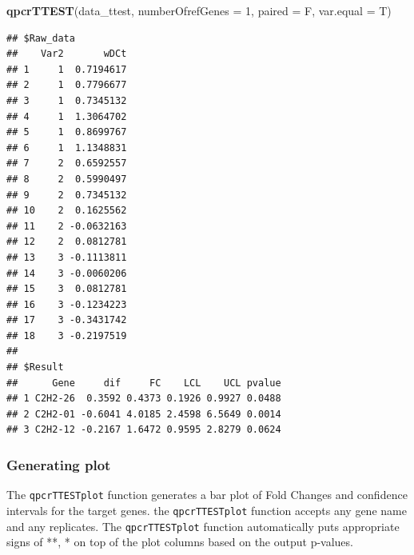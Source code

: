 \documentclass[
]{article}
\newenvironment{Shaded}{\begin{snugshade}}{\end{snugshade}}
\newcommand{\AttributeTok}[1]{\textcolor[rgb]{0.13,0.29,0.53}{#1}}
\newcommand{\DecValTok}[1]{\textcolor[rgb]{0.00,0.00,0.81}{#1}}
\newcommand{\FunctionTok}[1]{\textcolor[rgb]{0.13,0.29,0.53}{\textbf{#1}}}
\newcommand{\NormalTok}[1]{#1}
\begin{document}
\begin{Shaded}
\begin{Highlighting}[]
\FunctionTok{qpcrTTEST}\NormalTok{(data\_ttest, }
          \AttributeTok{numberOfrefGenes =} \DecValTok{1}\NormalTok{,}
          \AttributeTok{paired =}\NormalTok{ F, }
          \AttributeTok{var.equal =}\NormalTok{ T)}
\end{Highlighting}
\end{Shaded}

\begin{verbatim}
## $Raw_data
##    Var2       wDCt
## 1     1  0.7194617
## 2     1  0.7796677
## 3     1  0.7345132
## 4     1  1.3064702
## 5     1  0.8699767
## 6     1  1.1348831
## 7     2  0.6592557
## 8     2  0.5990497
## 9     2  0.7345132
## 10    2  0.1625562
## 11    2 -0.0632163
## 12    2  0.0812781
## 13    3 -0.1113811
## 14    3 -0.0060206
## 15    3  0.0812781
## 16    3 -0.1234223
## 17    3 -0.3431742
## 18    3 -0.2197519
## 
## $Result
##      Gene     dif     FC    LCL    UCL pvalue
## 1 C2H2-26  0.3592 0.4373 0.1926 0.9927 0.0488
## 2 C2H2-01 -0.6041 4.0185 2.4598 6.5649 0.0014
## 3 C2H2-12 -0.2167 1.6472 0.9595 2.8279 0.0624
\end{verbatim}

\hypertarget{generating-plot}{%
\subsubsection{Generating plot}\label{generating-plot}}

The \texttt{qpcrTTESTplot} function generates a bar plot of Fold Changes
and confidence intervals for the target genes. the
\texttt{qpcrTTESTplot} function accepts any gene name and any
replicates. The \texttt{qpcrTTESTplot} function automatically puts
appropriate signs of **, * on top of the plot columns based on the
output p-values.
\end{document}

